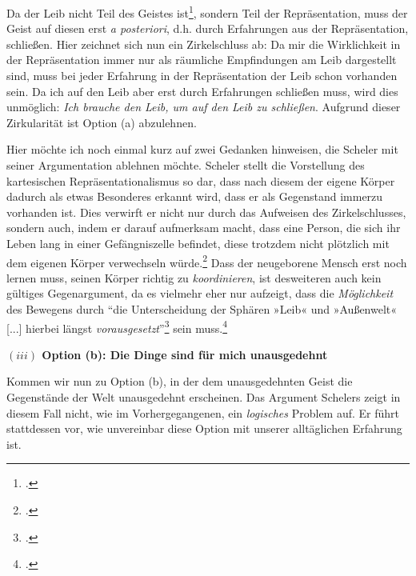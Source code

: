 \documentclass[a4paper, 12pt]{article}
\begin{document}
\begin{onehalfspace}

Da der Leib nicht Teil des Geistes ist\footnote{\Cite[Vgl.][S. 499]{scheler-ethik}.}, sondern Teil der Repräsentation, muss der Geist auf diesen erst \emph{a posteriori}, d.h. durch Erfahrungen aus der Repräsentation, schließen. Hier zeichnet sich nun ein Zirkelschluss ab: Da mir die Wirklichkeit in der Repräsentation immer nur als räumliche Empfindungen am Leib dargestellt sind, muss bei jeder Erfahrung in der Repräsentation der Leib schon vorhanden sein. Da ich auf den Leib aber erst durch Erfahrungen schließen muss, wird dies unmöglich: \emph{Ich brauche den Leib, um auf den Leib zu schließen}. Aufgrund dieser Zirkularität ist Option (a) abzulehnen.

Hier möchte ich noch einmal kurz auf zwei Gedanken hinweisen, die Scheler mit seiner Argumentation ablehnen möchte. Scheler stellt die Vorstellung des kartesischen Repräsentationalismus so dar, dass nach diesem der eigene Körper dadurch als etwas Besonderes erkannt wird, dass er als Gegenstand immerzu vorhanden ist. Dies verwirft er nicht nur durch das Aufweisen des Zirkelschlusses, sondern auch, indem er darauf aufmerksam macht, dass eine Person, die sich ihr Leben lang in einer Gefängniszelle befindet, diese trotzdem nicht plötzlich mit dem eigenen Körper verwechseln würde.\footnote{\Cite[Vgl.][S. 494]{scheler-ethik}.} Dass der neugeborene Mensch erst noch lernen muss, seinen Körper richtig zu \emph{koordinieren}, ist desweiteren auch kein gültiges Gegenargument, da es vielmehr eher nur aufzeigt, dass die \emph{Möglichkeit} des Bewegens durch "`die Unterscheidung der Sphären »Leib« und »Außenwelt« [...] hierbei längst \emph{vorausgesetzt}"'\footnote{\Cite[Siehe][S. 496]{scheler-ethik}.} sein muss.\footnote{\Cite[Vgl. zudem auch][S. 492]{scheler-ethik}.} 


\vspace{5mm}
\noindent\textbf{$(iii)$ Option (b): Die Dinge sind für mich unausgedehnt}


\noindent Kommen wir nun zu Option (b), in der dem unausgedehnten Geist die Gegenstände der Welt unausgedehnt erscheinen. Das Argument Schelers zeigt in diesem Fall nicht, wie im Vorhergegangenen, ein \emph{logisches} Problem auf. Er führt stattdessen vor, wie unvereinbar diese Option mit unserer alltäglichen Erfahrung ist.



\end{onehalfspace}
\end{document}
